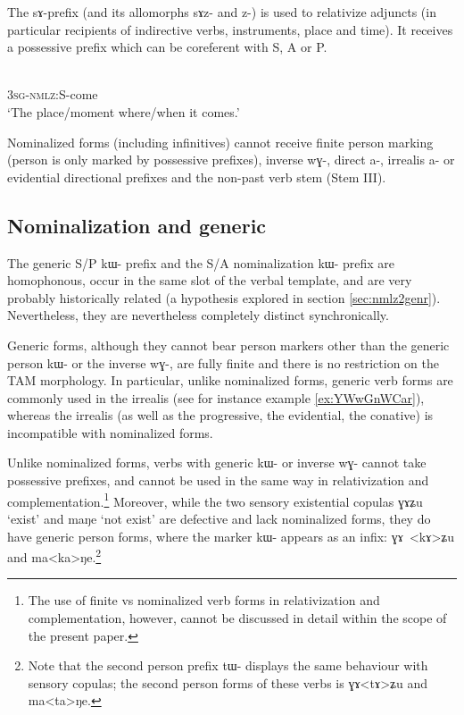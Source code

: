 \documentclass[oldfontcommands,oneside,a4paper,11pt]{article}
\newcommand{\ipa}[1]{{\phon \mbox{#1}}} %
\begin{document}
 The \ipa{sɤ}-prefix (and its allomorphs \ipa{sɤz}- and \ipa{z}-) is used to relativize adjuncts (in particular recipients of indirective verbs, instruments, place and time).  It receives a possessive prefix  which can be coreferent with S, A or P.

   \begin{exe}
\ex \label{ex:come}
\gll \ipa{ɯ-sɤ-ɣi}    \\
   \textsc{3sg-nmlz}:S-come \\
 \glt  `The place/moment where/when it comes.'
 \end{exe}

Nominalized forms (including infinitives) cannot receive finite person marking (person is only marked by possessive prefixes), inverse \ipa{wɣ}-, direct \ipa{a}-, irrealis \ipa{a}- or evidential directional prefixes and the non-past verb stem (Stem III).
 
 

 \subsection{Nominalization and generic}  
The generic S/P \ipa{kɯ-} prefix and the S/A nominalization \ipa{kɯ-} prefix are homophonous, occur in the same slot of the verbal template, and are very probably historically related (a hypothesis explored in section \ref{sec:nmlz2genr}). Nevertheless, they are nevertheless completely distinct synchronically. 

Generic forms, although they cannot bear person markers other than the generic  person \ipa{kɯ-} or the inverse \ipa{wɣ-}, are fully finite and there is no restriction on the TAM morphology. In particular, unlike nominalized forms, generic verb forms are commonly used in the irrealis (see for instance example \ref{ex:YWwGnWCar}), whereas the irrealis (as well as the progressive, the evidential, the conative) is incompatible with  nominalized forms.

Unlike nominalized forms,  verbs with generic \ipa{kɯ-} or   inverse \ipa{wɣ-} cannot take possessive prefixes, and cannot be used in the same way in relativization and complementation.\footnote{The use of finite vs nominalized verb forms in relativization and complementation, however, cannot be discussed in detail within the scope of the present paper.} Moreover, while the  two sensory existential copulas \ipa{ɣɤʑu} `exist' and \ipa{maŋe} `not exist'  are defective and lack nominalized forms, they do have generic person forms, where the marker \ipa{kɯ-}   appears  as an infix: \ipa{ɣɤ
<kɤ>ʑu} and \ipa{ma<ka>ŋe}.\footnote{Note that the second person prefix \ipa{tɯ-} displays the same behaviour with sensory copulas; the second person forms of these verbs is \ipa{ɣɤ<tɤ>ʑu} and \ipa{ma<ta>ŋe}. } 
\end{document}
